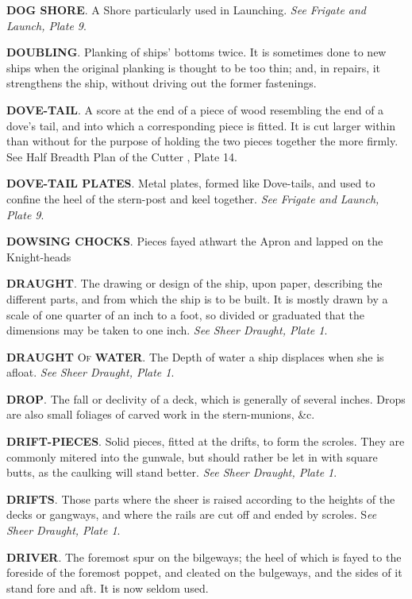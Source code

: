 \textbf{DOG SHORE}. A Shore particularly used in Launching. \textit{See Frigate and Launch, Plate 9}.

\textbf{DOUBLING}. Planking of ships' bottoms twice. It is sometimes done to new ships when the original planking is thought to be too thin; and, in repairs, it strengthens the ship, without driving out the former fastenings. 

\textbf{DOVE-TAIL}. A score at the end of a piece of wood resembling the end of a dove's tail, and into which a corresponding piece is fitted. It is cut larger within than without for the purpose of holding the two pieces together the more firmly. See Half Breadth Plan of the Cutter , Plate 14. 

\textbf{DOVE-TAIL PLATES}. Metal plates, formed like Dove-tails, and used to confine the heel of the stern-post and keel together. \textit{See Frigate and Launch, Plate 9}. 

\textbf{DOWSING CHOCKS}. Pieces fayed athwart the Apron and lapped on the Knight-heads 

\textbf{DRAUGHT}. The drawing or design of the ship, upon paper, describing the different parts, and from which the ship is to be built. It is mostly drawn by a scale of one quarter of an inch to a foot, so divided or graduated that the dimensions may be taken to one inch. \textit{See Sheer Draught, Plate 1}. 

\textbf{DRAUGHT} \textsc{Of} \textbf{WATER}. The Depth of water a ship displaces when she is afloat. \textit{See Sheer Draught, Plate 1}. 

\textbf{DROP}. The fall or declivity of a deck, which is generally of several inches. Drops are also small foliages of carved work in the stern-munions, \&c. 

\textbf{DRIFT-PIECES}. Solid pieces, fitted at the drifts, to form the scroles. They are commonly mitered into the gunwale, but should rather be let in with square butts, as the caulking will stand better. \textit{See Sheer Draught, Plate 1}. 

\textbf{DRIFTS}. Those parts where the sheer is raised according to the heights of the decks or gangways, and where the rails are cut off and ended by scroles. S\textit{ee Sheer Draught, Plate 1}. 

\textbf{DRIVER}. The foremost spur on the bilgeways; the heel of which is fayed to the foreside of the foremost poppet, and cleated on the bulgeways, and the sides of it stand fore and aft. It is now seldom used. 


